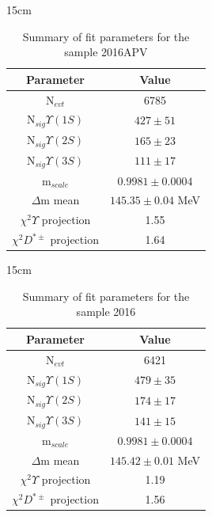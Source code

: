 \begin{table}[!htbp]{15cm}
  \caption{Summary of fit parameters for the sample 2016APV}\label{tab:fit_summary_2016APV}
  \begin{tabular}{ c | c }
    Parameter & Value \\ 
    \hline
    N$_{evt}$                    & 6785 \\ \hline
    N$_{sig} \Upsilon(1S)$       & $427 \pm 51$ \\ \hline
    N$_{sig} \Upsilon(2S)$       & $165 \pm 23$ \\ \hline
    N$_{sig} \Upsilon(3S)$       & $111 \pm 17$ \\ \hline
    m$_{scale}$                  & $0.9981 \pm 0.0004$ \\ \hline
    $\Delta$m mean               & $145.35 \pm 0.04$ MeV \\ \hline
    $\chi^2 \Upsilon$ projection & 1.55 \\ \hline
    $\chi^2 D^{*\pm}$ projection & 1.64 \\ \hline
  \end{tabular}
\end{table}

\begin{table}[!htbp]{15cm}
  \caption{Summary of fit parameters for the sample 2016}\label{tab:fit_summary_2016}
  \begin{tabular}{ c | c }
    Parameter & Value \\ 
    \hline
    N$_{evt}$                    & 6421 \\ \hline
    N$_{sig} \Upsilon(1S)$       & $479 \pm 35$ \\ \hline
    N$_{sig} \Upsilon(2S)$       & $174 \pm 17$ \\ \hline
    N$_{sig} \Upsilon(3S)$       & $141 \pm 15$ \\ \hline
    m$_{scale}$                  & $0.9981 \pm 0.0004$ \\ \hline
    $\Delta$m mean               & $145.42 \pm 0.01$ MeV \\ \hline
    $\chi^2 \Upsilon$ projection & 1.19 \\ \hline
    $\chi^2 D^{*\pm}$ projection & 1.56 \\ \hline
  \end{tabular}
\end{table}

